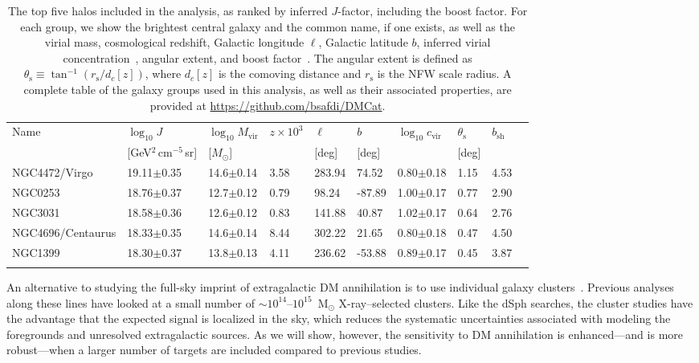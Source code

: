 \begin{table}[htb]
\footnotesize
\begin{tabular}{C{3.0cm}C{2.1cm}C{1.8cm}C{1.8cm}C{1.8cm}C{1.5cm}C{1.6cm}C{1.6cm}C{1.6cm}C{1.6m}}
\toprule
\Xhline{3\arrayrulewidth}
Name &   $\log_{10} J$  &  $\log_{10} M_\text{vir}$ &          $z \times 10^{3}$&        $\ell$ &        $b$ &  $\log_{10} c_\text{vir}$ &  $\theta_\text{s}$  &  $b_\text{sh}$   \\
 & {[GeV$^2$\,cm$^{-5}$\,sr]}& [$M_\odot$] &  & [deg] & [deg] & & [deg] &\\
\midrule
\hline
            NGC4472/Virgo &  19.11$\pm$0.35 &  14.6$\pm$0.14 &   3.58 &  283.94 &  74.52 &  0.80$\pm$0.18 &     1.15 &  4.53 \\
                  NGC0253 &  18.76$\pm$0.37 &  12.7$\pm$0.12 &   0.79 &   98.24 & -87.89 &  1.00$\pm$0.17 &     0.77 &  2.90 \\
                  NGC3031 &  18.58$\pm$0.36 &  12.6$\pm$0.12 &   0.83 &  141.88 &  40.87 &  1.02$\pm$0.17 &     0.64 &  2.76 \\
        NGC4696/Centaurus &  18.33$\pm$0.35 &  14.6$\pm$0.14 &   8.44 &  302.22 &  21.65 &  0.80$\pm$0.18 &     0.47 &  4.50 \\
                  NGC1399 &  18.30$\pm$0.37 &  13.8$\pm$0.13 &   4.11 &  236.62 & -53.88 &  0.89$\pm$0.17 &     0.45 &  3.87 \\
\bottomrule
\Xhline{3\arrayrulewidth}
\end{tabular}
\caption{The top five halos included in the analysis, as ranked by inferred $J$-factor, including the boost factor.  For each group, we show the brightest central galaxy and the common name, if one exists, as well as the virial mass, cosmological redshift, Galactic longitude $\ell$, Galactic latitude $b$, inferred virial concentration~\cite{Correa:2015dva}, angular extent, and boost factor~\cite{Bartels:2015uba}.  The angular extent is defined as $\theta_\text{s} \equiv \tan^{-1} (r_\text{s} / d_c[z])$, where $d_c[z]$ is the comoving distance and $r_\text{s}$ is the NFW scale radius.  A complete table of the galaxy groups used in this analysis, as well as their associated properties, are provided at \url{https://github.com/bsafdi/DMCat}.
}
\label{Jtab}
\end{table}

An alternative to studying the full-sky imprint of extragalactic DM annihilation is to use individual galaxy clusters~\cite{Ackermann:2010rg, Ando:2012vu,Ackermann:2013iaq,Ackermann:2015fdi,Anderson:2015dpc,Rephaeli:2015nca,2016A&A...589A..33A,Liang:2016pvm,Adams:2016alz,Huang:2011xr}. Previous analyses along these lines have looked at  
  a small number of $\sim$$10^{14}$--$10^{15}$~M$_\odot$ X-ray--selected clusters. 
  Like the dSph searches, the cluster studies have the advantage that the expected signal is localized in the sky, which reduces the systematic uncertainties associated with modeling the foregrounds and unresolved extragalactic sources.  As we will show, however, the sensitivity to DM annihilation is enhanced---and is more robust---when a larger number of targets are included compared to previous studies.

